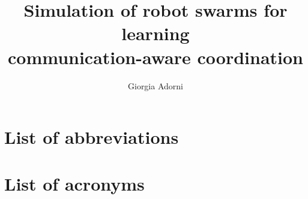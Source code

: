\documentclass[mscthesis, 11pt,oneside]{usiinfthesis}
\title{Simulation of robot swarms for learning\\ communication-aware coordination} %
\author{Giorgia Adorni} %
\begin{document}
\maketitle %

\frontmatter %

\begin{abstract}
\begingroup
\let\clearpage\relax

\endgroup
\end{abstract}


\begin{acknowledgements}
\begingroup
\let\clearpage\relax

\endgroup
\end{acknowledgements}

\tableofcontents 
\listoffigures %
\listoftables %


\mainmatter











\appendix%
	
\chapter{List of abbreviations}
\label{chp:abbreviations}
\let\clearpage\relax
\vspace*{-90pt}
\printglossary[title= ]

\newpage
\let\cleardoublepage\clearpage

\chapter{List of acronyms}
\label{chp:acronyms}
\glsaddall  %
\vspace*{-120pt}
\printglossary[type=acronym]

\backmatter

%
%
\nocite{*}



\end{document}
